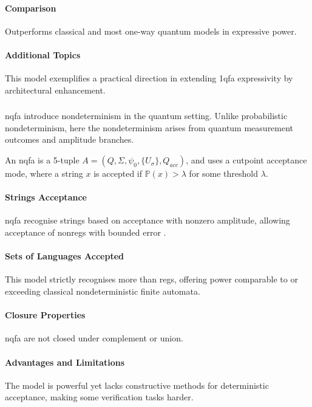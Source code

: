 \paragraph{Comparison}
Outperforms classical and most one-way quantum models in expressive power.

\paragraph{Additional Topics}
This model exemplifies a practical direction in extending \gls{1qfa} expressivity by architectural enhancement.

\subsubsection{}
\gls{nqfa} introduce nondeterminism in the quantum setting. Unlike probabilistic nondeterminism, here the nondeterminism arises from quantum measurement outcomes and amplitude branches.

\begin{definition}
An \gls{nqfa} is a 5-tuple \( A = (Q, \Sigma, \psi_0, \{U_\sigma\}, Q_{acc}) \), and uses a cutpoint acceptance mode, where a string \( x \) is accepted if \( \mathbb{P}(x) > \lambda \) for some threshold \( \lambda \).
\end{definition}

\paragraph{Strings Acceptance}
\gls{nqfa} recognise strings based on acceptance with nonzero amplitude, allowing acceptance of non\glspl{reg} with bounded error \cite{yakaryilmaz2009languages}.

\paragraph{Sets of Languages Accepted}
This model strictly recognises more than \glspl{reg}, offering power comparable to or exceeding classical nondeterministic finite automata.

\paragraph{Closure Properties}
\gls{nqfa} are not closed under complement or union.

\paragraph{Advantages and Limitations}
The model is powerful yet lacks constructive methods for deterministic acceptance, making some verification tasks harder.


